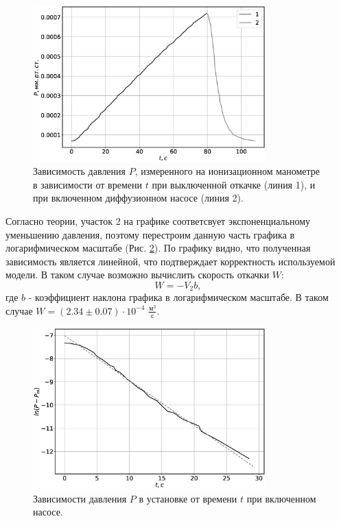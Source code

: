 \documentclass[12pt]{article}
\begin{document}
\begin{figure}[H]
    \centering
    \includegraphics[width=0.8\textwidth]{Pt.eps}
    \caption{Зависимость давления $P$, измеренного на ионизационном манометре в зависимости от 
    времени $t$ при выключенной откачке (линия 1), и при включенном диффузионном насосе (линия 2).}
    \label{fig:Pt}
\end{figure}

Согласно теории, участок 2 на графике соответсвует экспоненциальному уменьшению давления, поэтому перестроим 
данную часть графика в логарифмическом масштабе (Рис. \ref{fig:Pdownt}). По графику видно, что полученная 
зависимость является линейной, что подтверждает корректность используемой модели. В таком случае возможно 
вычислить скорость откачки $W$: 
\[
    W = - V_2 b, 
\] 
где $b$ - коэффициент наклона графика в логарифмическом масштабе. В таком случае $W = (2.34 \pm 0.07) \cdot 10 ^ {-4}$ $\frac{\text{м}^3}{\text{с}}$.     
\begin{figure}[H]
    \centering
    \includegraphics[width=0.8\textwidth]{Pdownt.eps}
    \caption{Зависимости давления $P$ в установке от времени $t$ при включенном насосе.}
    \label{fig:Pdownt}
\end{figure}
\end{document}

